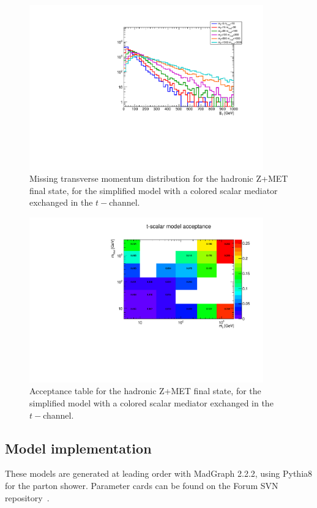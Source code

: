 \begin{figure}[h!]
	\centering  
	\includegraphics[width=0.9\textwidth]{figures/EW/monoZhad_TChannel/metPt}
	\caption{Missing transverse momentum distribution for the hadronic Z+MET final state,
		for the simplified model with a colored scalar mediator exchanged in the $t-$channel.}
	\label{fig:TChan_EW_Zhad_MET}
\end{figure}

\begin{figure}[h!]
	\centering  
	\includegraphics[width=0.9\textwidth]{figures/EW/monoZhad_TChannel/acc}
	\caption{Acceptance table for the hadronic Z+MET final state,
		for the simplified model with a colored scalar mediator exchanged in the $t-$channel.}
	\label{fig:TChan_EW_Zhad_acc}
\end{figure}

\subsection{Model implementation}

These models are generated at leading
order with MadGraph 2.2.2, using Pythia8 for the parton shower.
Parameter cards can be found on the Forum SVN repository~\cite{TODO}.
